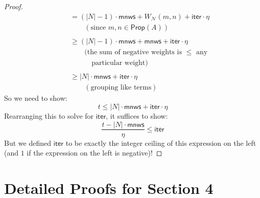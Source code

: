 \documentclass[letterpaper]{article}
\theoremstyle{definition}
\newcommand{\minscore}{\mathsf{mnws}}
\newcommand{\numiterations}{\mathsf{iter}}
\newcommand{\Net}{\mathcal{N}}
\newcommand{\Prop}{\textsf{Prop}}
\begin{document}
\begin{proof}
\[\begin{array}{l}
        \quad \quad =
        (|N| - 1) \cdot \minscore + W_\Net(m, n) + \numiterations \cdot \eta \\
        \quad \quad \quad \quad (\mbox{since } m, n \in \Prop(A))\\ \\

        \quad \quad \geq
        (|N| - 1) \cdot \minscore + \minscore + \numiterations \cdot \eta \\
        \quad \quad \quad \quad (\mbox{the sum of negative weights is } \leq \mbox{ any }\\
        \quad \quad \quad \quad \quad \mbox{particular weight})\\ \\

        \quad \quad \geq
        |N| \cdot \minscore + \numiterations \cdot \eta \\
        \quad \quad \quad \quad (\mbox{grouping like terms})
    \end{array}
    \]
    So we need to show:
    \[
        t \leq |N| \cdot \minscore + \numiterations \cdot \eta
    \]
    Rearranging this to solve for $\numiterations$, it suffices to show:
    \[
        \frac{t - |N| \cdot \minscore}{\eta} \leq \numiterations
    \]
    But we defined $\numiterations$ to be exactly the integer ceiling of this expression on the left (and $1$ if the expression on the left is negative)!
\end{proof}

\section{Detailed Proofs for Section 4}
\end{document}
